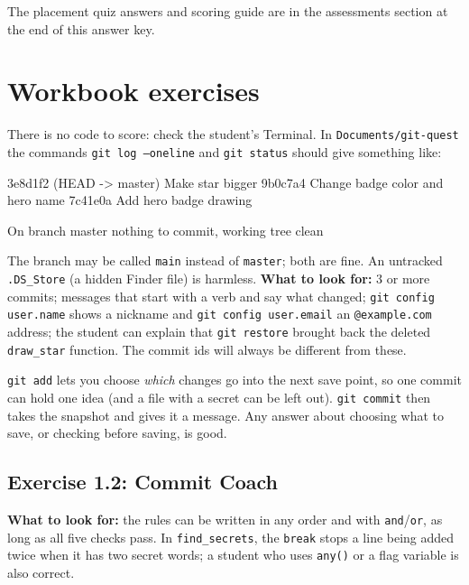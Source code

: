 
\begin{teachernote}
The placement quiz answers and scoring guide are in the assessments section at the end of this answer key.
\end{teachernote}

\section{Workbook exercises}
\begin{answer}
There is no code to score: check the student's Terminal. In \texttt{Documents/git-quest} the commands
\texttt{git log --oneline} and \texttt{git status} should give something like:
\begin{outputcode}
3e8d1f2 (HEAD -> master) Make star bigger
9b0c7a4 Change badge color and hero name
7c41e0a Add hero badge drawing

On branch master
nothing to commit, working tree clean
\end{outputcode}
The branch may be called \texttt{main} instead of \texttt{master}; both are fine. An untracked \texttt{.DS\_Store} (a hidden Finder file) is harmless.
\textbf{What to look for:} 3 or more commits; messages that start with a verb and say what changed;
\texttt{git config user.name} shows a nickname and \texttt{git config user.email} an \texttt{@example.com} address;
the student can explain that \texttt{git restore} brought back the deleted \texttt{draw\_star} function.
The commit ids will always be different from these.
\end{answer}

\begin{answer}
\texttt{git add} lets you choose \emph{which} changes go into the next save point, so one commit can hold one idea (and a file with a secret can be left out). \texttt{git commit} then takes the snapshot and gives it a message. Any answer about choosing what to save, or checking before saving, is good.
\end{answer}

\subsection{Exercise 1.2: Commit Coach}
\begin{answer}
\textbf{What to look for:} the rules can be written in any order and with \texttt{and}/\texttt{or}, as long as all five checks pass.
In \texttt{find\_secrets}, the \texttt{break} stops a line being added twice when it has two secret words; a student who uses
\texttt{any()} or a flag variable is also correct.
\end{answer}

